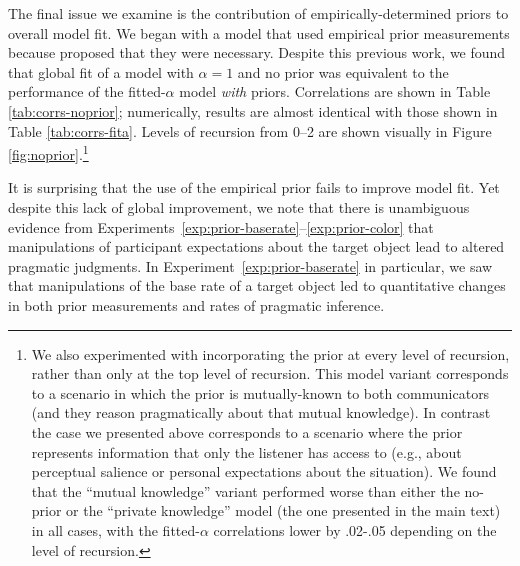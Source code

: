 \documentclass[man]{apa6}
\newcounter{Experiment}
\newcommand{\exptref}[1]{Experiment~\ref{#1}}
\newcommand{\exptrefrange}[2]{Experiments~\ref{#1}--\ref{#2}}
\begin{document}
The final issue we examine is the contribution of empirically-determined priors to overall model fit. We began with a model that used empirical prior measurements because  proposed that they were necessary. Despite this previous work, we found that global fit of a model with $\alpha=1$ and no prior was equivalent to the performance of the fitted-$\alpha$ model \emph{with} priors. Correlations are shown in Table \ref{tab:corrs-noprior}; numerically, results are almost identical with those shown in Table \ref{tab:corrs-fita}. Levels of recursion from 0--2 are shown visually in Figure \ref{fig:noprior}.\footnote{We also experimented with incorporating the prior at every level of recursion, rather than only at the top level of recursion. This model variant corresponds to a scenario in which the prior is mutually-known to both communicators (and they reason pragmatically about that mutual knowledge). In contrast the case we presented above corresponds to a scenario where the prior represents information that only the listener has access to (e.g., about perceptual salience or personal expectations about the situation). We found that the ``mutual knowledge'' variant performed worse than either the no-prior or the ``private knowledge'' model (the one presented in the main text) in all cases, with the fitted-$\alpha$ correlations lower by .02-.05 depending on the level of recursion.}

It is surprising that the use of the empirical prior fails to improve model fit. Yet despite this lack of global improvement, we note that there is unambiguous evidence from \exptrefrange{exp:prior-baserate}{exp:prior-color} that manipulations of participant expectations about the target object lead to altered pragmatic judgments. In \exptref{exp:prior-baserate} in particular, we saw that manipulations of the base rate of a target object led to quantitative changes in both prior measurements and rates of pragmatic inference.
\end{document}
